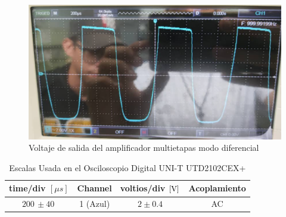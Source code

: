 \begin{enumerate}
\begin{itemize}
                \begin{figure}[H]
                  \centering
                  \renewcommand{\figurename}{Imagen}
                  \includegraphics[width=\textwidth]{Imagenes/vodmultietapas.png}
                  \caption{Voltaje de salida del amplificador multietapas modo diferencial}
                  \label{fig:vodmultietapas}
                \end{figure}

                \begin{table}[H]
                  \centering
                  \begin{tabular}{|c|c|c|c|}
                    \hline
                    \textbf{time/div} $[\mu s]$ & \textbf{Channel} & \textbf{voltios/div $[\volt]$} & \textbf{Acoplamiento} \\ \hline
                    $200 \, \pm 40 \, $         & 1 (Azul)         & $2 \pm 0.4  $                  & AC                    \\ \hline
                  \end{tabular}
                  \caption{Escalas Usada en el Osciloscopio Digital UNI-T UTD2102CEX+}
                  \label{tab:escala_vodmultietapas}
                \end{table}


\end{itemize}
\end{enumerate}
